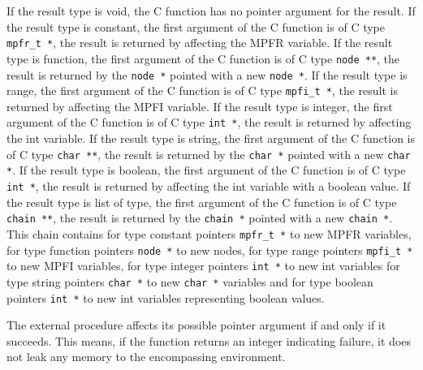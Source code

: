 \begin{itemize}
   If the \sollya result type is void, the C function has no pointer
   argument for the result.  If the \sollya result type is constant, the
   first argument of the C function is of C type \texttt{mpfr\_t *}, the result is
   returned by affecting the MPFR variable.  If the \sollya result type
   is function, the first argument of the C function is of C type \texttt{node **},
   the result is returned by the \texttt{node *} pointed with a new \texttt{node *}.
   If the \sollya result type is range, the first argument of the C
   function is of C type \texttt{mpfi\_t *}, the result is returned by affecting
   the MPFI variable.  If the \sollya result type is integer, the first
   argument of the C function is of C type \texttt{int *}, the result is returned
   by affecting the int variable.  If the \sollya result type is string,
   the first argument of the C function is of C type \texttt{char **}, the result
   is returned by the \texttt{char *} pointed with a new \texttt{char *}.  If the \sollya
   result type is boolean, the first argument of the C function is of C
   type \texttt{int *}, the result is returned by affecting the int variable with
   a boolean value.  If the \sollya result type is list of type, the
   first argument of the C function is of C type \texttt{chain **}, the result is
   returned by the \texttt{chain *} pointed with a new \texttt{chain *}.  This chain
   contains for \sollya type constant pointers \texttt{mpfr\_t *} to new MPFR
   variables, for \sollya type function pointers \texttt{node *} to new nodes, for
   \sollya type range pointers \texttt{mpfi\_t *}  to new MPFI variables, for
   \sollya type integer pointers \texttt{int *} to new int variables for \sollya
   type string pointers \texttt{char *} to new \texttt{char *} variables and for \sollya
   type boolean pointers \texttt{int *} to new int variables representing boolean
   values.
    	       
   The external procedure affects its possible pointer argument if and
   only if it succeeds.  This means, if the function returns an integer
   indicating failure, it does not leak any memory to the encompassing
   environment.
    

\end{itemize}
